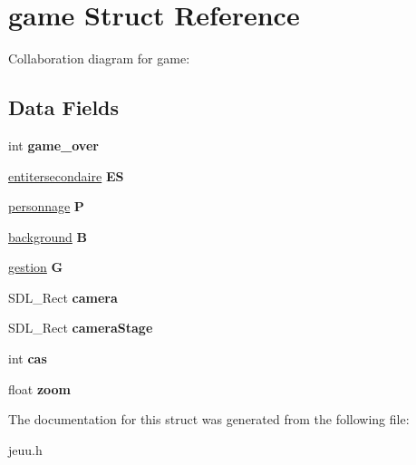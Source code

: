 \hypertarget{structgame}{}\section{game Struct Reference}
\label{structgame}


Collaboration diagram for game\+:
\subsection*{Data Fields}
\begin{DoxyCompactItemize}
\item 
int {\bfseries game\+\_\+over}\hypertarget{structgame_adb23cc3d6f0535752e1227e6c87d4dff}{}\label{structgame_adb23cc3d6f0535752e1227e6c87d4dff}

\item 
\hyperlink{structentitersecondaire}{entitersecondaire} {\bfseries ES}\hypertarget{structgame_a53c42f68b45b692e672b66d8684db150}{}\label{structgame_a53c42f68b45b692e672b66d8684db150}

\item 
\hyperlink{structpersonnage}{personnage} {\bfseries P}\hypertarget{structgame_a56622798488a5f9622a40c14b2dd01a6}{}\label{structgame_a56622798488a5f9622a40c14b2dd01a6}

\item 
\hyperlink{structbackground}{background} {\bfseries B}\hypertarget{structgame_ab23d5a6fdb61c6e98d66195ce3959bd2}{}\label{structgame_ab23d5a6fdb61c6e98d66195ce3959bd2}

\item 
\hyperlink{structgestion}{gestion} {\bfseries G}\hypertarget{structgame_af0a1faddea3ed3f4124a6751abad6ed2}{}\label{structgame_af0a1faddea3ed3f4124a6751abad6ed2}

\item 
S\+D\+L\+\_\+\+Rect {\bfseries camera}\hypertarget{structgame_a015bb26ee7c0902fe38649e157576c81}{}\label{structgame_a015bb26ee7c0902fe38649e157576c81}

\item 
S\+D\+L\+\_\+\+Rect {\bfseries camera\+Stage}\hypertarget{structgame_a07bf589783018ba4ee4fb11c9af3fab5}{}\label{structgame_a07bf589783018ba4ee4fb11c9af3fab5}

\item 
int {\bfseries cas}\hypertarget{structgame_afc629f483ce05e8774f60b929f60d947}{}\label{structgame_afc629f483ce05e8774f60b929f60d947}

\item 
float {\bfseries zoom}\hypertarget{structgame_af9fab6998758cbae3c3e1d1caaa744bc}{}\label{structgame_af9fab6998758cbae3c3e1d1caaa744bc}

\end{DoxyCompactItemize}


The documentation for this struct was generated from the following file\+:\begin{DoxyCompactItemize}
\item 
jeuu.\+h\end{DoxyCompactItemize}
